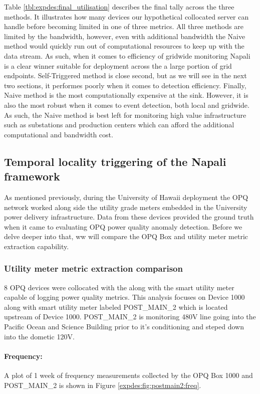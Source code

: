 Table \ref{tbl:expdes:final_utilisation} describes the final tally across the three methods.
It illustrates how many devices our hypothetical collocated server can handle before becoming limited in one of three metrics.
All three methods are limited by the bandwidth, however, even with additional bandwidth the Naive method would quickly run out of computational resources to keep up with the data stream.
As such, when it comes to efficiency of gridwide monitoring Napali is a clear winner suitable for deployment across the a large portion of grid endpoints.
Self-Triggered method is close second, but as we will see in the next two sections, it performes poorly when it comes to detection efficiency.
Finally, Naive method is the most computationally expensive at the sink.
However, it is also the most robust when it comes to event detection, both local and gridwide.
As such, the Naive method is best left for monitoring high value infrastructure such as substations and production centers which can afford the additional computational and bandwidth cost.

\subsection{Temporal locality triggering of the Napali framework} \label{subsec:temporal-locality-triggering-of-the-napali-framework}
As mentioned previously, during the University of Hawaii deployment the OPQ network worked along side the utility grade meters embedded in the University power delivery infrastructure.
Data from these devices provided the ground truth when it came to evaluating OPQ power quality anomaly detection.
Before we delve deeper into that, ww will compare the OPQ Box and utility meter metric extraction capability.

\subsubsection{Utility meter metric extraction comparison}

8 OPQ devices were collocated with the along with the smart utility meter capable of logging power quality metrics.
This analysis focuses on Device 1000 along with smart utility meter labeled POST\_MAIN\_2 which is located upstream of Device 1000.
POST\_MAIN\_2 is monitoring 480V line going into the Pacific Ocean and Science Building prior to it's conditioning and steped down into the dometic 120V.

\paragraph{Frequency:}
A plot of 1 week of frequency measurements collected by the OPQ Box 1000 and POST\_MAIN\_2 is shown in Figure \ref{expdes:fig:postmain2:freq}.

